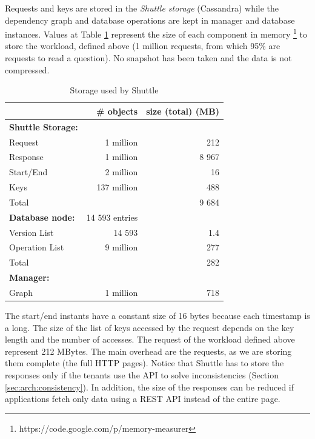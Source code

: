 Requests and keys are stored in the \emph{Shuttle storage} (Cassandra) while the dependency graph and database operations are kept in  manager and database instances. Values at Table \ref{tab:storage_overhead} represent the size of each component in memory \footnote{https://code.google.com/p/memory-measurer} to store the workload, defined above (1 million requests, from which 95\% are requests to read a question). No snapshot has been taken and the data is not compressed.

\begin{table}[ht]
\centering
  \begin{tabular}{l|rr}   
              & \# objects   & size (total) (MB) \\ \hline
  \textbf{Shuttle Storage: }             \\
  Request     & 1 million    & 212       \\  %
  Response    & 1 million    & 8 967     \\  %
  Start/End   & 2 million    & 16        \\  %
  Keys        & 137 million  & 488       \\  %
  Total       &              & 9 684     \\  %
  \textbf{Database node:} & 14 593 entries \\ 
  Version   List &  14 593    &  1.4       \\ %
  Operation List &  9 million &  277       \\ %
  Total       &               & 282 \\ %
  \textbf{Manager:} & & \\ 
  Graph       & 1 million     & 718 \\  %
  \end{tabular}            
\caption{Storage used by Shuttle}
\label{tab:storage_overhead}
\end{table}


The start/end instants have a constant size of 16 bytes because each timestamp is a long. The size of the list of keys accessed by the request depends on the key length and the number of accesses. The request of the workload defined above represent 212 MBytes. The main overhead are the requests, as we are storing them complete (the full \ac{HTTP} pages). Notice that Shuttle has to store the responses only if the tenants use the \ac{API} to solve inconsistencies (Section \ref{sec:arch:consistency}). In addition, the size of the responses can be reduced if applications fetch only data using a \ac{REST} \ac{API} instead of the entire page.

